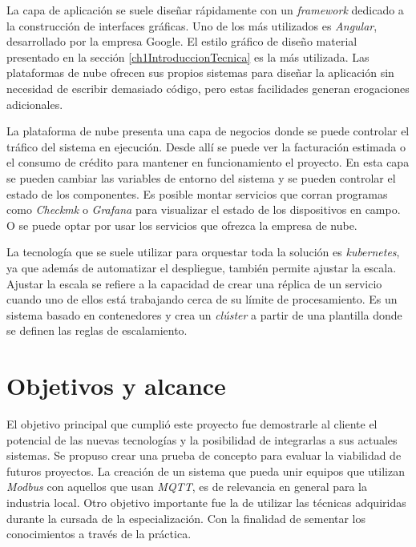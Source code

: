 La capa de aplicación se suele diseñar rápidamente con un \emph{framework} dedicado a la construcción de interfaces gráficas.
Uno de los más utilizados es \emph{Angular}, desarrollado por la empresa Google.
El estilo gráfico de diseño material presentado en la sección \ref{ch1IntroduccionTecnica} es la más utilizada.
Las plataformas de nube ofrecen sus propios sistemas para diseñar la aplicación sin necesidad de escribir demasiado código, pero estas facilidades generan erogaciones adicionales.

La plataforma de nube presenta una capa de negocios donde se puede controlar el tráfico del sistema en ejecución.
Desde allí se puede ver la facturación estimada o el consumo de crédito para mantener en funcionamiento el proyecto.
En esta capa se pueden cambiar las variables de entorno del sistema y se pueden controlar el estado de los componentes.
Es posible montar servicios que corran programas como \emph{Checkmk} o \emph{Grafana} para visualizar el estado de los dispositivos en campo. O se puede optar por usar los servicios que ofrezca la empresa de nube.

La tecnología que se suele utilizar para orquestar toda la solución es \emph{kubernetes}, ya que además de automatizar el despliegue, también permite ajustar la escala.
Ajustar la escala se refiere a la capacidad de crear una réplica de un servicio cuando uno de ellos está trabajando cerca de su límite de procesamiento.
Es un sistema basado en contenedores y crea un \emph{clúster} a partir de una plantilla donde se definen las reglas de escalamiento.

\section{Objetivos y alcance}
\label{objetivos}

El objetivo principal que cumplió este proyecto fue demostrarle al cliente el potencial de las nuevas tecnologías y la posibilidad de integrarlas a sus actuales sistemas.
Se propuso crear una prueba de concepto para evaluar la viabilidad de futuros proyectos.
La creación de un sistema que pueda unir equipos que utilizan \emph{Modbus} con aquellos que usan \emph{MQTT}, es de relevancia en general para la industria local.
Otro objetivo importante fue la de utilizar las técnicas adquiridas durante la cursada de la especialización.
Con la finalidad de sementar los conocimientos a través de la práctica.


